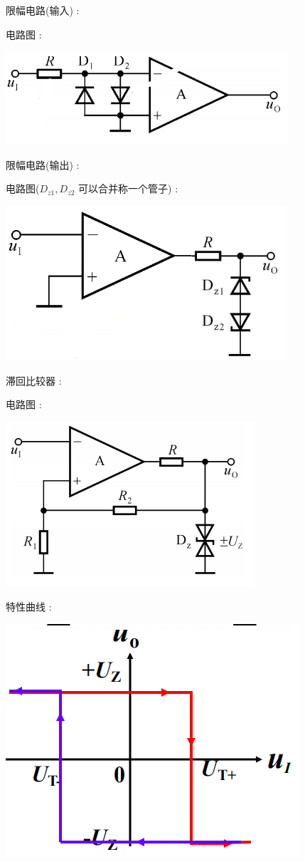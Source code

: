 \documentclass[UTF8, 12pt]{ctexart}
\begin{document}
	限幅电路(输入) :

	电路图 :

	\includegraphics[scale = 0.4]{07/限幅电路(输入).png}

	限幅电路(输出) :

	电路图($ D_{z1}, D_{z2} $ 可以合并称一个管子) :

	\includegraphics[scale = 0.4]{07/限幅电路(输出).png}

	滞回比较器 :

	电路图 :

	\includegraphics[scale = 0.4]{07/滞回比较器电路图.png}

	特性曲线 :

	\includegraphics[scale = 0.4]{07/滞回比较器特性曲线.png}
\end{document}
